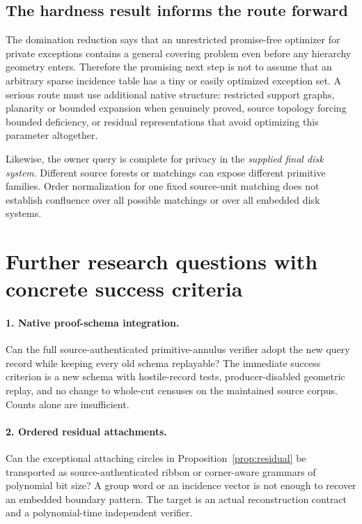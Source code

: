 \documentclass[11pt,letterpaper]{article}
\theoremstyle{definition}
\begin{document}
\subsection{The hardness result informs the route forward}
The domination reduction says that an unrestricted promise-free optimizer for private exceptions contains a general covering problem even before any hierarchy geometry enters. Therefore the promising next step is not to assume that an arbitrary sparse incidence table has a tiny or easily optimized exception set. A serious route must use additional native structure: restricted support graphs, planarity or bounded expansion when genuinely proved, source topology forcing bounded deficiency, or residual representations that avoid optimizing this parameter altogether.

Likewise, the owner query is complete for privacy in the \emph{supplied final disk system}. Different source forests or matchings can expose different primitive families. Order normalization for one fixed source-unit matching does not establish confluence over all possible matchings or over all embedded disk systems.

\section{Further research questions with concrete success criteria}
\paragraph{1. Native proof-schema integration.}
Can the full source-authenticated primitive-annulus verifier adopt the new query record while keeping every old schema replayable? The immediate success criterion is a new schema with hostile-record tests, producer-disabled geometric replay, and no change to whole-cut censuses on the maintained source corpus. Counts alone are insufficient.

\paragraph{2. Ordered residual attachments.}
Can the exceptional attaching circles in Proposition~\ref{prop:residual} be transported as source-authenticated ribbon or corner-aware grammars of polynomial bit size? A group word or an incidence vector is not enough to recover an embedded boundary pattern. The target is an actual reconstruction contract and a polynomial-time independent verifier.
\end{document}
